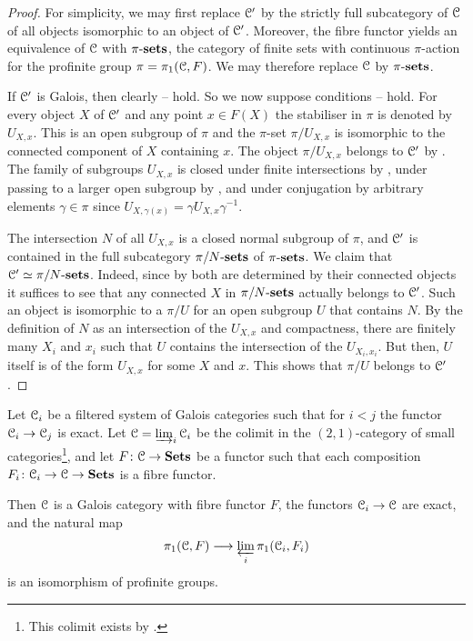 \begin{proof}
    For simplicity, we may first replace ${\mathcal C}'$ by the strictly full subcategory of ${\mathcal C}$ of all objects isomorphic to an object of ${\mathcal C}'$. Moreover, the fibre functor yields an equivalence of ${\mathcal C}$ with $\pi\text{-}\mathbf{sets}$, the category of finite sets with continuous $\pi$-action for the profinite group $\pi = \pi_1({\mathcal C},F)$. We may therefore replace ${\mathcal C}$ by $\pi\text{-}\mathbf{sets}$. 

    If ${\mathcal C}'$ is Galois, then clearly 
    -- hold. So we now suppose conditions -- hold. 
    For every object $X$ of ${\mathcal C}'$ and any point $x \in F(X)$ the stabiliser in $\pi$ is denoted by $U_{X,x}$. This is an open subgroup of $\pi$ and the $\pi$-set $\pi/U_{X,x}$ is isomorphic to the connected component of $X$ containing $x$. The object $\pi/U_{X,x}$ belongs to ${\mathcal C}'$ by 
    . The family of subgroups $U_{X,x}$ is closed under finite intersections by , 
    under passing to a larger open subgroup by , and under conjugation by arbitrary elements $\gamma \in \pi$ since $U_{X,\gamma(x)} = \gamma U_{X,x} \gamma^{-1}$.

    The intersection $N$ of all $U_{X,x}$ is a closed normal subgroup of $\pi$, and ${\mathcal C}'$ is contained in the full subcategory $\pi/N\text{-}\mathbf{sets}$ of $\pi\text{-}\mathbf{sets}$. We claim that ${\mathcal C}' \simeq \pi/N\text{-}\mathbf{sets}$. Indeed, since by  both are determined by their connected objects it suffices to see that any connected $X$ in $\pi/N\text{-}\mathbf{sets}$ actually belongs to ${\mathcal C}'$. Such an object is isomorphic to a $\pi/U$ for an open subgroup $U$ that contains $N$. By the definition of $N$ as an intersection of the $U_{X,x}$ and compactness, there are finitely many $X_i$ and $x_i$ such that $U$ contains the intersection of the $U_{X_i,x_i}$. But then, $U$ itself is of the form $U_{X,x}$ for some $X$ and $x$. This shows that $\pi/U$  belongs to ${\mathcal C}'$.
\end{proof}

\begin{lem}
\label{lem:filtered colimits of Galois categories}
   Let ${\mathcal C}_i$ be a filtered system of Galois categories such that for $i < j$ the functor ${\mathcal C}_i \to {\mathcal C}_j$ is exact. Let ${\mathcal C} = \varinjlim_i {\mathcal C}_i$ be the colimit in the $(2,1)$-category of small categories\footnote{This colimit exists by  \cite[3.74]{Kelly:EnrichedCats}.}, and let $F\colon {\mathcal C} \to \mathbf{Sets}$ be a functor such that each composition $F_i\colon {\mathcal C}_i \to {\mathcal C} \to \mathbf{Sets}$ is a fibre functor. 
   
   Then ${\mathcal C}$ is a Galois category with fibre functor $F$, the functors ${\mathcal C}_i \to {\mathcal C}$ are exact, and the natural map 
   \[
   \pi_1({\mathcal C},F) \longrightarrow \varprojlim_i \pi_1({\mathcal C}_i, F_i)
   \]
   is an isomorphism of profinite groups.
\end{lem}

